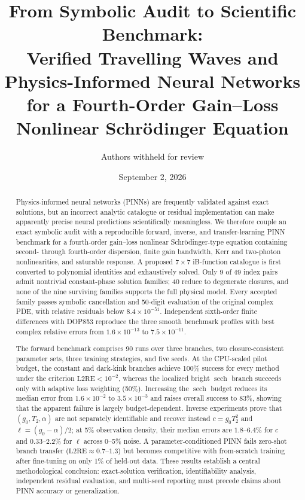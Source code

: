\documentclass[11pt]{article}
\title{\textbf{From Symbolic Audit to Scientific Benchmark:}\\
Verified Travelling Waves and Physics-Informed Neural Networks for a
Fourth-Order Gain--Loss Nonlinear Schr\"odinger Equation}
\author{Authors withheld for review}
\date{September 2, 2026}
\newcommand{\Ltwo}{\mathrm{L2RE}}
\newcommand{\sech}{\operatorname{sech}}
\begin{document}
\maketitle

\begin{abstract}
Physics-informed neural networks (PINNs) are frequently validated against exact
solutions, but an incorrect analytic catalogue or residual implementation can
make apparently precise neural predictions scientifically meaningless.  We
therefore couple an exact symbolic audit with a reproducible forward, inverse,
and transfer-learning PINN benchmark for a fourth-order gain--loss nonlinear
Schr\"odinger-type equation containing second- through fourth-order dispersion,
finite gain bandwidth, Kerr and two-photon nonlinearities, and saturable
response.  A proposed $7\times7$ iB-function catalogue is first converted to
polynomial identities and exhaustively solved.  Only 9 of 49 index pairs admit
nontrivial constant-phase solution families; 40 reduce to degenerate closures,
and none of the nine surviving families supports the full physical model.
Every accepted family passes symbolic cancellation and 50-digit evaluation of
the original complex PDE, with relative residuals below $8.4\times10^{-51}$.
Independent sixth-order finite differences with DOP853 reproduce the three
smooth benchmark profiles with best complex relative errors from
$1.6\times10^{-13}$ to $7.5\times10^{-11}$.

The forward benchmark comprises 90 runs over three branches, two
closure-consistent parameter sets, three training strategies, and five seeds.
At the CPU-scaled pilot budget, the constant and dark-kink branches achieve
100\% success for every method under the criterion $\Ltwo<10^{-2}$, whereas
the localized bright $\sech$ branch succeeds only with adaptive loss weighting
(50\%).  Increasing the $\sech$ budget reduces its median error from
$1.6\times10^{-2}$ to $3.5\times10^{-3}$ and raises overall success to 83\%,
showing that the apparent failure is largely budget-dependent.  Inverse
experiments prove that $(g_0,T_2,\alpha)$ are not separately identifiable and
recover instead $c=g_0T_2^2$ and $\ell=(g_0-\alpha)/2$; at 5\% observation
density, their median errors are $1.8$--$6.4\%$ for $c$ and $0.33$--$2.2\%$
for $\ell$ across 0--5\% noise.  A parameter-conditioned PINN fails zero-shot
branch transfer ($\Ltwo\approx0.7$--$1.3$) but becomes competitive with
from-scratch training after fine-tuning on only 1\% of held-out data.  These
results establish a central methodological conclusion: exact-solution
verification, identifiability analysis, independent residual evaluation, and
multi-seed reporting must precede claims about PINN accuracy or
generalization.
\end{abstract}
\end{document}
